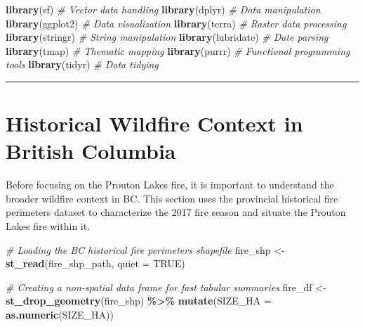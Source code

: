 \documentclass[
]{article}
\newenvironment{Shaded}{\begin{snugshade}}{\end{snugshade}}
\newcommand{\AttributeTok}[1]{\textcolor[rgb]{0.13,0.29,0.53}{#1}}
\newcommand{\CommentTok}[1]{\textcolor[rgb]{0.56,0.35,0.01}{\textit{#1}}}
\newcommand{\ConstantTok}[1]{\textcolor[rgb]{0.56,0.35,0.01}{#1}}
\newcommand{\FunctionTok}[1]{\textcolor[rgb]{0.13,0.29,0.53}{\textbf{#1}}}
\newcommand{\NormalTok}[1]{#1}
\newcommand{\OtherTok}[1]{\textcolor[rgb]{0.56,0.35,0.01}{#1}}
\newcommand{\SpecialCharTok}[1]{\textcolor[rgb]{0.81,0.36,0.00}{\textbf{#1}}}
\begin{document}
\begin{Shaded}
\begin{Highlighting}[]
\FunctionTok{library}\NormalTok{(sf)         }\CommentTok{\# Vector data handling}
\FunctionTok{library}\NormalTok{(dplyr)      }\CommentTok{\# Data manipulation}
\FunctionTok{library}\NormalTok{(ggplot2)    }\CommentTok{\# Data visualization}
\FunctionTok{library}\NormalTok{(terra)      }\CommentTok{\# Raster data processing}
\FunctionTok{library}\NormalTok{(stringr)    }\CommentTok{\# String manipulation}
\FunctionTok{library}\NormalTok{(lubridate)  }\CommentTok{\# Date parsing}
\FunctionTok{library}\NormalTok{(tmap)       }\CommentTok{\# Thematic mapping}
\FunctionTok{library}\NormalTok{(purrr)      }\CommentTok{\# Functional programming tools}
\FunctionTok{library}\NormalTok{(tidyr)      }\CommentTok{\# Data tidying}
\end{Highlighting}
\end{Shaded}

\begin{center}\rule{0.5\linewidth}{0.5pt}\end{center}

\section{Historical Wildfire Context in British
Columbia}\label{historical-wildfire-context-in-british-columbia}

Before focusing on the Prouton Lakes fire, it is important to understand
the broader wildfire context in BC. This section uses the provincial
historical fire perimeters dataset to characterize the 2017 fire season
and situate the Prouton Lakes fire within it.

\begin{Shaded}
\begin{Highlighting}[]
\CommentTok{\# Loading the BC historical fire perimeters shapefile}
\NormalTok{fire\_shp }\OtherTok{\textless{}{-}} \FunctionTok{st\_read}\NormalTok{(fire\_shp\_path, }\AttributeTok{quiet =} \ConstantTok{TRUE}\NormalTok{)}

\CommentTok{\# Creating a non{-}spatial data frame for fast tabular summaries}
\NormalTok{fire\_df }\OtherTok{\textless{}{-}} \FunctionTok{st\_drop\_geometry}\NormalTok{(fire\_shp) }\SpecialCharTok{\%\textgreater{}\%}
  \FunctionTok{mutate}\NormalTok{(}\AttributeTok{SIZE\_HA =} \FunctionTok{as.numeric}\NormalTok{(SIZE\_HA))}
\end{Highlighting}
\end{Shaded}
\end{document}
